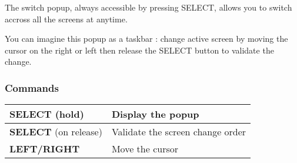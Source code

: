 The switch popup, always accessible by pressing SELECT, allows you to switch accross all the screens at anytime.


You can imagine this popup as a taskbar : change active screen by moving the cursor on the right or left then release the SELECT button to validate the change.

\subsubsection{Commands}
\tablelasttail{\hline}
\begin{supertabular}{|l|l|}
\hline
    {\bf SELECT} (hold) & Display the popup \\
    \hline
    {\bf SELECT} (on release) & Validate the screen change order \\
    \hline
    {\bf LEFT/RIGHT} & Move the cursor \\
\hline
\end{supertabular}

